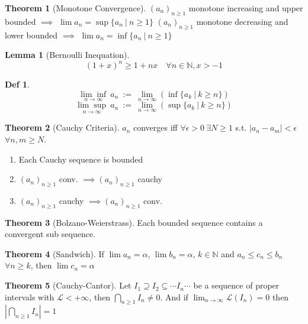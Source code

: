 \documentclass[a4paper, 10pt]{article}
\newtheorem*{lemma}{Lemma}
\theoremstyle{definition}
\newtheorem*{definition}{Def}
\theoremstyle{named}
\newtheorem*{ntheorem_wrapper}{Theorem}
\newenvironment{ntheorem}%
    {\begin{mdframed}[style=important]\begin{ntheorem_wrapper}}%
    {\end{ntheorem_wrapper}\end{mdframed}}
\newcommand{\N}{\mathbb{N}}
\begin{document}
\begin{ntheorem}[Monotone Convergence]
    $(a_n)_{n \geq 1}$ monotone increasing and upper bounded $\implies$ $\lim a_n = \sup\{a_n \ | \ n\geq 1\}$ \newline
    $(a_n)_{n \geq 1}$ monotone decreasing and lower bounded $\implies$ $\lim a_n = \inf\{a_n \ | \ n\geq 1\}$
\end{ntheorem}

\begin{lemma}[Bernoulli Inequation]
    $$(1 + x)^n \geq 1 + nx \quad \forall n \in \N, x > -1$$
\end{lemma}

\begin{definition}
    $$\underset{n\to\infty}{\lim\inf} \ a_n \ := \ \lim_{n\to\infty} (\inf \{a_k \ | \ k \geq n\})$$
    $$\underset{n\to\infty}{\lim\sup} \ a_n \ := \ \lim_{n\to\infty} (\sup \{a_k \ | \ k \geq n\})$$
\end{definition}

\begin{ntheorem}[Cauchy Criteria]
    $a_n$ converges iff $\forall \epsilon > 0 \ \exists N \geq 1$ s.t. $|a_n - a_m| < \epsilon$ $\forall n,m \geq N$.
    \begin{enumerate}[label=(\roman*)]
        \item Each Cauchy sequence is bounded
        \item $(a_n)_{n \geq 1}$ conv. $\implies (a_n)_{n \geq 1}$ cauchy
        \item $(a_n)_{n \geq 1}$ cauchy $\implies (a_n)_{n \geq 1}$ conv.
    \end{enumerate}
\end{ntheorem}

\begin{ntheorem}[Bolzano-Weierstrass]
    Each bounded sequence contains a convergent sub sequence.
\end{ntheorem}

\begin{ntheorem}[Sandwich]
    If $\lim a_n = \alpha$, $\lim b_n = \alpha$, $k \in \N$ and $a_n \leq c_n \leq b_n$ $\forall n \geq k$, then $\lim c_n = \alpha$
\end{ntheorem}

\begin{ntheorem}[Cauchy-Cantor]
    Let $I_1 \supseteq I_2 \subseteq \cdots I_n \cdots$ be a sequence of proper intervals with $\mathcal{L} < + \infty$, then $\bigcap_{n\geq1} I_n \neq 0$. And if $\lim_{n \to \infty} \mathcal{L}(I_n) = 0$ then $|\bigcap_{n\geq1} I_n| = 1$
\end{ntheorem}
\end{document}
